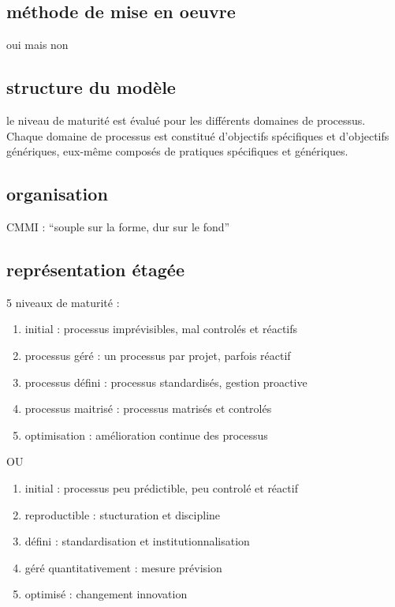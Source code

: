 	\subsection{méthode de mise en oeuvre}

oui mais non

	\subsection{structure du modèle}

le niveau de maturité est évalué pour les différents domaines de processus. Chaque domaine de processus est constitué d’objectifs spécifiques et d’objectifs génériques, eux-même composés de pratiques spécifiques et génériques.

	\subsection{organisation}

CMMI : “souple sur la forme, dur sur le fond”

	\subsection{représentation étagée}

5 niveaux de maturité :
\begin{enumerate}
\item initial : processus imprévisibles, mal controlés et réactifs
\item processus géré : un processus par projet, parfois réactif
\item processus défini : processus standardisés, gestion proactive
\item processus maitrisé : processus matrisés et controlés
\item optimisation : amélioration continue des processus
\end{enumerate}

OU

\begin{enumerate}
\item initial : processus peu prédictible, peu controlé et réactif
\item reproductible : stucturation et discipline
\item défini : standardisation et institutionnalisation
\item géré quantitativement : mesure prévision
\item optimisé : changement innovation
\end{enumerate}

